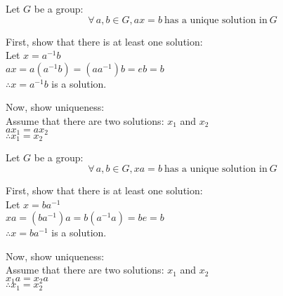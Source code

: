 \documentclass[letterpaper,12pt,fleqn]{article}
\begin{document}
\begin{theorem}
  Let $G$ be a group:
  \[\forall\,a,b\in G,ax=b\ \mbox{has a unique solution in}\ G\]
\end{theorem}

\begin{theproof}
  First, show that there is at least one solution: \\
  Let $x=a^{-1}b$ \\
  $ax=a(a^{-1}b)=(aa^{-1})b=eb=b$ \\
  $\therefore x=a^{-1}b$ is a solution.

  Now, show uniqueness: \\
  Assume that there are two solutions: $x_1$ and $x_2$ \\
  $ax_1=ax_2$ \\
  $\therefore x_1=x_2$
\end{theproof}

\begin{theorem}
  Let $G$ be a group:
  \[\forall\,a,b\in G,xa=b\ \mbox{has a unique solution in}\ G\]
\end{theorem}

\begin{theproof}
  First, show that there is at least one solution: \\
  Let $x=ba^{-1}$ \\
  $xa=(ba^{-1})a=b(a^{-1}a)=be=b$ \\
  $\therefore x=ba^{-1}$ is a solution.

  Now, show uniqueness: \\
  Assume that there are two solutions: $x_1$ and $x_2$ \\
  $x_1a=x_2a$ \\
  $\therefore x_1=x_2$
\end{theproof}
\end{document}
